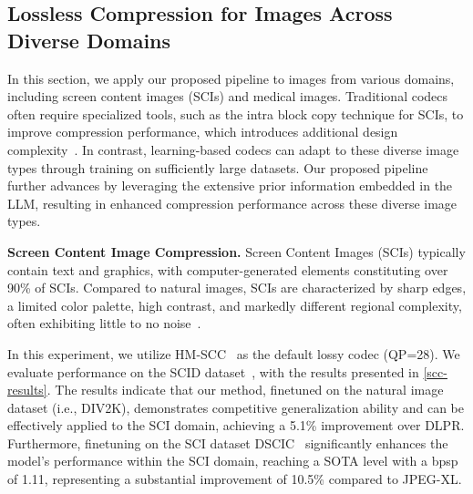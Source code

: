 \subsection{Lossless Compression for Images Across Diverse Domains}
In this section, we apply our proposed pipeline to images from various domains, including screen content images (SCIs) and medical images. Traditional codecs often require specialized tools, such as the intra block copy technique for SCIs, to improve compression performance, which introduces additional design complexity~\cite{7265040}. In contrast, learning-based codecs can adapt to these diverse image types through training on sufficiently large datasets. Our proposed pipeline further advances by leveraging the extensive prior information embedded in the LLM, resulting in enhanced compression performance across these diverse image types.

\textbf{Screen Content Image Compression.}
Screen Content Images (SCIs) typically contain text and graphics, with computer-generated elements constituting over 90\% of SCIs. Compared to natural images, SCIs are characterized by sharp edges, a limited color palette, high contrast, and markedly different regional complexity, often exhibiting little to no noise~\cite{nguyen2021overview}.

In this experiment, we utilize HM-SCC~\cite{7265040} as the default lossy codec (QP=28). We evaluate performance on the SCID dataset~\cite{8266580}, with the results presented in \cref{scc-results}. The results indicate that our method, finetuned on the natural image dataset (i.e., DIV2K), demonstrates competitive generalization ability and can be effectively applied to the SCI domain, achieving a 5.1\% improvement over DLPR. Furthermore, finetuning on the SCI dataset DSCIC~\cite{10577165} significantly enhances the model's performance within the SCI domain, reaching a SOTA level with a bpsp of 1.11, representing a substantial improvement of 10.5\% compared to JPEG-XL.

